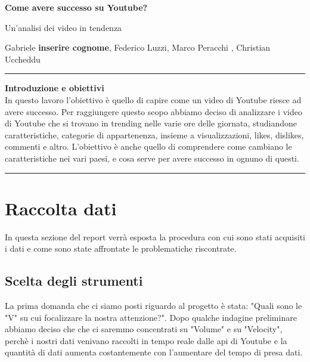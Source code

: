 \documentclass[10pt, a4paper,openany]{article}
\begin{document}
\begin{center}
\huge\textbf{Come avere successo su Youtube?}

Un'analisi dei video in tendenza
\end{center}

\begin{center}
Gabriele \textbf{inserire cognome}, Federico Luzzi,  Marco Peracchi , Christian Uccheddu
\end{center}

\hrule
\vspace{0.5cm}

\centering\textbf{{Introduzione e obiettivi}}
\\

In questo lavoro l'obiettivo è quello di capire come un video di Youtube riesce ad avere successo. Per raggiungere questo scopo abbiamo deciso di analizzare i video di Youtube che si trovano in trending nelle varie ore delle giornata, studiandone caratteristiche, categorie di appartenenza, insieme a visualizzazioni, likes, dislikes, commenti e altro.
L'obiettivo è anche quello di comprendere come cambiano le caratteristiche nei vari paesi, e cosa serve per avere successo in ognuno di questi.
\vspace{0.5cm}
\hrule

\flushleft
\section*{Raccolta dati}

In questa sezione del report verrà esposta la procedura con cui sono stati acquisiti i dati e come sono state affrontate le problematiche riscontrate.
\subsection*{Scelta degli strumenti}
La prima domanda che ci siamo posti riguardo al progetto è stata: "Quali sono le "V" su cui focalizzare la nostra attenzione?".
Dopo qualche indagine preliminare abbiamo deciso che che ci saremmo concentrati su "Volume" e su "Velocity", perchè i nostri dati venivano raccolti in tempo reale dalle api di Youtube e la quantità di dati aumenta costantemente con l'aumentare del tempo di presa dati.
\end{document}
